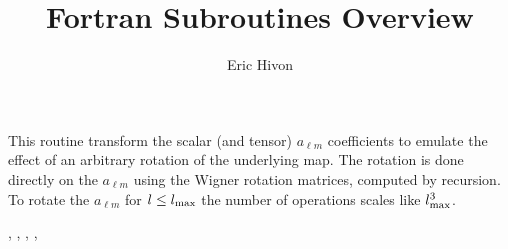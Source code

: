 
\sloppy


\title{\healpix Fortran Subroutines Overview}
 \section[rotate\_alm*]{ }
\label{sub:rotate_alm}
\author{Eric Hivon}

\begin{facility}
{This routine transform the scalar (and tensor) $a_{\ell m}$ coefficients to
emulate the effect of an arbitrary rotation of the underlying map. The rotation is done
directly on the $a_{\ell m}$ using the Wigner rotation matrices, computed by
recursion.
To rotate the $a_{\ell m}$ for $\ell \leq \ell_{\rm max}$ the number of
operations scales like $\ell^3_{\rm max}$.}
{\modAlmTools}
\end{facility}

\begin{f90format}
{%
, %
, %
, %
, %
}
\end{f90format}

